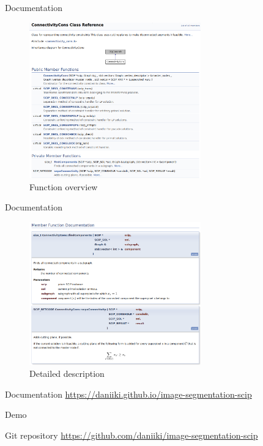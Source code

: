 \documentclass[fleqn]{beamer}
\begin{document}
    \begin{frame}{Documentation}
        \begin{figure}
            \centering
            \includegraphics[width=20em]{overviewdoc}
            \caption{Function overview}
        \end{figure}
    \end{frame}

    \begin{frame}{Documentation}
        \begin{figure}
            \centering
            \includegraphics[width=20em]{detaildoc}
            \caption{Detailed description}
        \end{figure}
    \end{frame}

    \begin{frame}{Documentation}
        \small\url{https://daniiki.github.io/image-segmentation-scip}
    \end{frame}

    \begin{frame}[standout]
        Demo
    \end{frame}

    \begin{frame}{Git repository}
        \small\url{https://github.com/daniiki/image-segmentation-scip}
    \end{frame}
\end{document}
